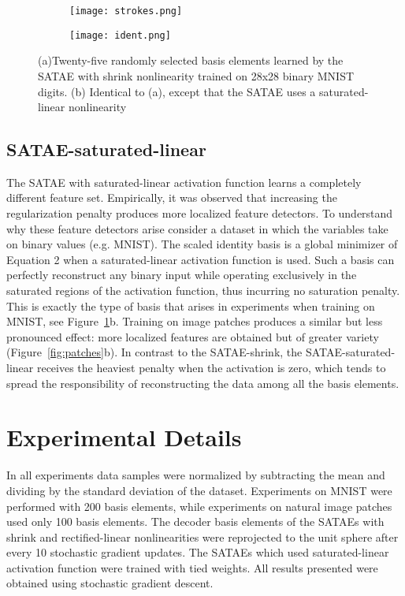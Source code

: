 \documentclass{article} %
\begin{document}
\begin{figure}
\centering 
\begin{subfigure}[b]{0.225\textwidth}
		\centering 
		\texttt{[image: strokes.png]}
		\caption{}
	\end{subfigure} 
	\begin{subfigure}[b]{0.225\textwidth}
		\centering 
		\texttt{[image: ident.png]}
		\caption{}
	\end{subfigure} 
\caption{(a)Twenty-five randomly selected basis elements learned by the SATAE with shrink nonlinearity trained on 28x28 binary MNIST digits. (b) Identical to (a), except that the SATAE uses a saturated-linear nonlinearity}
\label{fig:MNIST}
\end{figure} 

\subsection{SATAE-saturated-linear} 
The SATAE with saturated-linear activation function learns a completely different feature set. Empirically, it was observed that increasing the regularization penalty produces more localized feature detectors. To understand why these feature detectors arise consider a dataset in which the variables take on binary values (e.g. MNIST). The scaled identity basis is a global minimizer of Equation 2 when a saturated-linear activation function is used. Such a basis can perfectly reconstruct any binary input while operating exclusively in the saturated regions of the activation function, thus incurring no saturation penalty. This is exactly the type of basis that arises in experiments when training on MNIST, see Figure~\ref{fig:MNIST}b. Training on image patches produces a similar but less pronounced effect: more localized features are obtained but of greater variety (Figure~\ref{fig:patches}b). In contrast to the SATAE-shrink, the SATAE-saturated-linear receives the heaviest penalty when the activation is zero, which tends to spread the responsibility of reconstructing the data among all the basis elements.   

\section{Experimental Details}
In all experiments data samples were normalized by subtracting the mean and dividing by the standard deviation of the dataset. Experiments on MNIST were performed with 200 basis elements, while experiments on natural image patches used only 100 basis elements. The decoder basis elements of the SATAEs with shrink and rectified-linear nonlinearities were reprojected to the unit sphere after every 10 stochastic gradient updates. The SATAEs which used saturated-linear activation function were trained with tied weights. All results presented were obtained using stochastic gradient descent.
\end{document}
